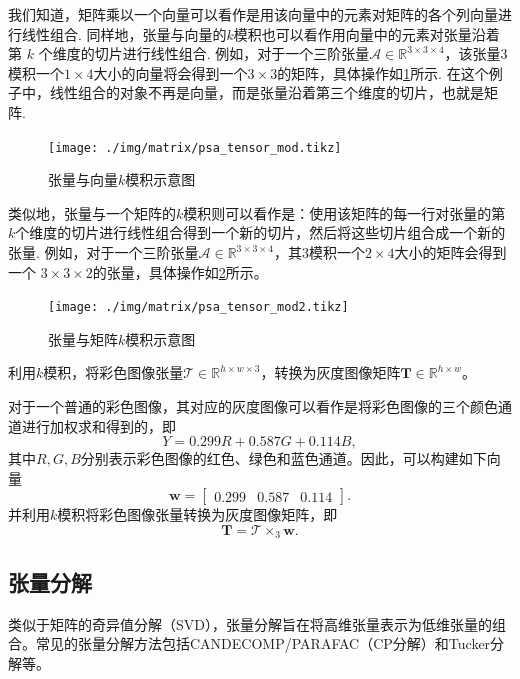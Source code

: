 我们知道，矩阵乘以一个向量可以看作是用该向量中的元素对矩阵的各个列向量进行线性组合. 同样地，张量与向量的$k$模积也可以看作用向量中的元素对张量沿着第 $k$ 个维度的切片进行线性组合. 例如，对于一个三阶张量$\mathcal A \in \mathbb {R}^{3 \times 3 \times 4 }$，该张量3模积一个$1\times 4$大小的向量将会得到一个\( 3 \times 3 \)的矩阵，具体操作如\cref{fig.psa.nmod_example}所示. 在这个例子中，线性组合的对象不再是向量，而是张量沿着第三个维度的切片，也就是矩阵.
\begin{figure}[htb!]
    \centering
    \texttt{[image: ./img/matrix/psa\_tensor\_mod.tikz]}
    \caption{张量与向量$k$模积示意图}
    \label{fig.psa.nmod_example}
\end{figure}

类似地，张量与一个矩阵的$k$模积则可以看作是：使用该矩阵的每一行对张量的第$k$个维度的切片进行线性组合得到一个新的切片，然后将这些切片组合成一个新的张量. 例如，对于一个三阶张量$\mathcal A \in \mathbb {R}^{3 \times 3 \times 4 }$，其3模积一个$2\times 4$大小的矩阵会得到一个 \( 3 \times 3 \times 2 \)的张量，具体操作如\cref{fig.psa.nmod_example2}所示。
\begin{figure}[htb!]
    \centering
    \texttt{[image: ./img/matrix/psa\_tensor\_mod2.tikz]}
    \caption{张量与矩阵$k$模积示意图}
    \label{fig.psa.nmod_example2}
\end{figure}

\begin{example}
    利用\( k \)模积，将彩色图像张量\( \mathcal{T} \in \mathbb{R}^{h \times w \times 3} \)，转换为灰度图像矩阵\( \mathbf{T} \in \mathbb{R}^{h \times w} \)。
\end{example}
\begin{solution}
    对于一个普通的彩色图像，其对应的灰度图像可以看作是将彩色图像的三个颜色通道进行加权求和得到的，即
    \[
        Y = 0.299 R + 0.587 G + 0.114 B,
    \]
    其中\( R, G, B \)分别表示彩色图像的红色、绿色和蓝色通道。因此，可以构建如下向量
    \[
        \bm{w} = \begin{bmatrix} 0.299 & 0.587 & 0.114 \end{bmatrix}.
    \]
    并利用\( k \)模积将彩色图像张量转换为灰度图像矩阵，即
    \[
        \mathbf{T} = \mathcal{T} \times_3 \bm{w}.
    \]
\end{solution}

\subsection{张量分解}

类似于矩阵的奇异值分解（SVD），张量分解旨在将高维张量表示为低维张量的组合。常见的张量分解方法包括CANDECOMP/PARAFAC（CP分解）和Tucker分解等。

